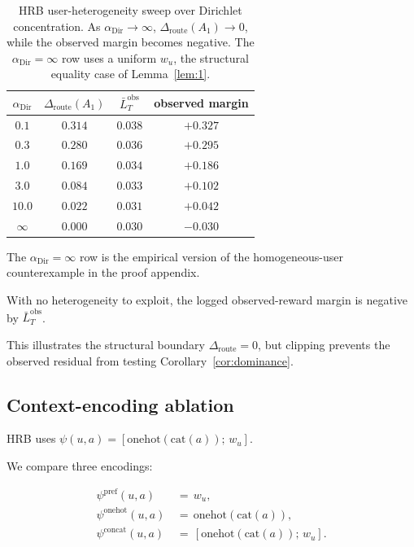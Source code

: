 \documentclass{article} %
\begin{document}
\begin{table}[h]
\centering
\small
\caption{HRB user-heterogeneity sweep over Dirichlet concentration. As
\(\alpha_{\mathrm{Dir}}\to\infty\),
\(\Delta_{\mathrm{route}}(A_1)\to0\), while the observed margin becomes
negative. The \(\alpha_{\mathrm{Dir}}=\infty\) row uses a uniform \(w_u\), the structural
equality case of Lemma~\ref{lem:1}.}
\label{tab:app-dirichlet}
\begin{tabular}{cccc}
\toprule
\(\alpha_{\mathrm{Dir}}\) & $\Delta_{\mathrm{route}}(A_1)$ & $\bar L_T^{\mathrm{obs}}$ & observed margin \\
\midrule
$0.1$  & $0.314$ & $0.038$ & $+0.327$ \\
$0.3$  & $0.280$ & $0.036$ & $+0.295$ \\
$1.0$  & $0.169$ & $0.034$ & $+0.186$ \\
$3.0$  & $0.084$ & $0.033$ & $+0.102$ \\
$10.0$ & $0.022$ & $0.031$ & $+0.042$ \\
$\infty$ & $0.000$ & $0.030$ & $-0.030$ \\
\bottomrule
\end{tabular}

\end{table}

The \(\alpha_{\mathrm{Dir}}=\infty\) row is the empirical version of the
homogeneous-user counterexample in the proof appendix.

With no heterogeneity to exploit, the logged observed-reward margin is negative
by \(\bar L_T^{\mathrm{obs}}\).

This illustrates the structural boundary \(\Delta_{\mathrm{route}}=0\), but
clipping prevents the observed residual from testing
Corollary~\ref{cor:dominance}.

\subsection{Context-encoding ablation}

\label{app:ctx-type}

HRB uses $\psi(u,a)=[\mathrm{onehot}(\mathrm{cat}(a));\,w_u]$.

We compare three encodings:

\begin{align}
\label{eq:app-ctx-pref}
\psi^{\mathrm{pref}}(u,a) &\,=\, w_u,\\
\label{eq:app-ctx-onehot}
\psi^{\mathrm{onehot}}(u,a) &\,=\, \mathrm{onehot}(\mathrm{cat}(a)),\\
\label{eq:app-ctx-concat}
\psi^{\mathrm{concat}}(u,a) &\,=\, [\mathrm{onehot}(\mathrm{cat}(a));\,w_u].
\end{align}
\end{document}
